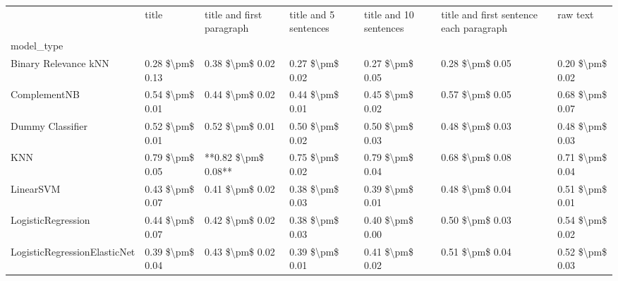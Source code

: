 \begin{tabular}{lllllll}
\toprule
{} &            title & title and first paragraph & title and 5 sentences & title and 10 sentences & title and first sentence each paragraph &         raw text \\
model\_type                      &                  &                           &                       &                        &                                         &                  \\
\midrule
Binary Relevance kNN            &  0.28 \$\textbackslash pm\$ 0.13 &           0.38 \$\textbackslash pm\$ 0.02 &       0.27 \$\textbackslash pm\$ 0.02 &        0.27 \$\textbackslash pm\$ 0.05 &                         0.28 \$\textbackslash pm\$ 0.05 &  0.20 \$\textbackslash pm\$ 0.02 \\
ComplementNB                    &  0.54 \$\textbackslash pm\$ 0.01 &           0.44 \$\textbackslash pm\$ 0.02 &       0.44 \$\textbackslash pm\$ 0.01 &        0.45 \$\textbackslash pm\$ 0.02 &                         0.57 \$\textbackslash pm\$ 0.05 &  0.68 \$\textbackslash pm\$ 0.07 \\
Dummy Classifier                &  0.52 \$\textbackslash pm\$ 0.01 &           0.52 \$\textbackslash pm\$ 0.01 &       0.50 \$\textbackslash pm\$ 0.02 &        0.50 \$\textbackslash pm\$ 0.03 &                         0.48 \$\textbackslash pm\$ 0.03 &  0.48 \$\textbackslash pm\$ 0.03 \\
KNN                             &  0.79 \$\textbackslash pm\$ 0.05 &       **0.82 \$\textbackslash pm\$ 0.08** &       0.75 \$\textbackslash pm\$ 0.02 &        0.79 \$\textbackslash pm\$ 0.04 &                         0.68 \$\textbackslash pm\$ 0.08 &  0.71 \$\textbackslash pm\$ 0.04 \\
LinearSVM                       &  0.43 \$\textbackslash pm\$ 0.07 &           0.41 \$\textbackslash pm\$ 0.02 &       0.38 \$\textbackslash pm\$ 0.03 &        0.39 \$\textbackslash pm\$ 0.01 &                         0.48 \$\textbackslash pm\$ 0.04 &  0.51 \$\textbackslash pm\$ 0.01 \\
LogisticRegression              &  0.44 \$\textbackslash pm\$ 0.07 &           0.42 \$\textbackslash pm\$ 0.02 &       0.38 \$\textbackslash pm\$ 0.03 &        0.40 \$\textbackslash pm\$ 0.00 &                         0.50 \$\textbackslash pm\$ 0.03 &  0.54 \$\textbackslash pm\$ 0.02 \\
LogisticRegressionElasticNet    &  0.39 \$\textbackslash pm\$ 0.04 &           0.43 \$\textbackslash pm\$ 0.02 &       0.39 \$\textbackslash pm\$ 0.01 &        0.41 \$\textbackslash pm\$ 0.02 &                         0.51 \$\textbackslash pm\$ 0.04 &  0.52 \$\textbackslash pm\$ 0.03 \\

\end{tabular}
